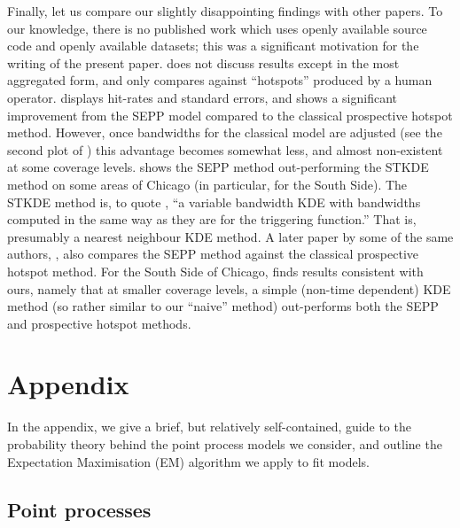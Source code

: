\documentclass[twoside,a4paper]{article}
\theoremstyle{plain}
\theoremstyle{definition}
\begin{document}
Finally, let us compare our slightly disappointing findings with other papers.
To our knowledge, there is no published work which uses openly available source code
and openly available datasets; this was a significant motivation for the writing of the
present paper.  \cite{sepp2} does not discuss results except in the most aggregated form,
and only compares against ``hotspots'' produced by a human operator.  
\cite[Figure~6]{sepp} displays hit-rates and standard errors, and shows a significant
improvement from the SEPP model compared to the classical prospective hotspot method.
However, once bandwidths for the classical model are adjusted (see the second plot
of \cite[Figure~6]{sepp}) this advantage becomes somewhat less, and almost non-existent
at some coverage levels.  \cite[Figure~12]{rc} shows the SEPP method out-performing the
STKDE method on some areas of Chicago (in particular, for the South Side).  The STKDE
method is, to quote \cite{rc}, ``a variable bandwidth KDE with bandwidths computed in the
same way as they are for the triggering function.''  That is, presumably a nearest neighbour
KDE method.  A later paper by some of the same authors, \cite{arc}, also compares the SEPP
method against the classical prospective hotspot method.  For the South Side of Chicago,
\cite[Figure~5]{arc} finds results consistent with ours, namely that at smaller coverage
levels, a simple (non-time dependent) KDE method (so rather similar to our ``naive''
method) out-performs both the SEPP and prospective hotspot methods.





\appendix
\section{Appendix}

In the appendix, we give a brief, but relatively self-contained, guide to the probability
theory behind the point process models we consider, and outline the Expectation
Maximisation (EM) algorithm we apply to fit models.


\subsection{Point processes}\label{app:pp}
\end{document}
